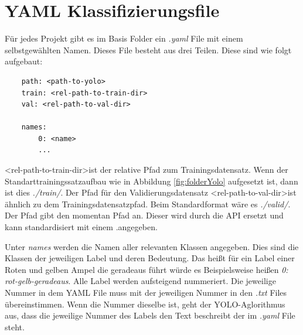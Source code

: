 \section{YAML Klassifizierungsfile}
\label{sec:yaml_class}

Für jedes Projekt gibt es im Basis Folder ein \textit{.yaml} File mit einem selbstgewählten Namen. Dieses File besteht aus drei Teilen. Diese sind wie folgt aufgebaut:
\begin{verbatim}
    path: <path-to-yolo>
    train: <rel-path-to-train-dir>
    val: <rel-path-to-val-dir>

    names:
        0: <name>
        ...
\end{verbatim}

\textless rel-path-to-train-dir\textgreater ist der relative Pfad zum Trainingsdatensatz. Wenn der Standarttrainingssatzaufbau wie in Abbildung \ref{fig:folderYolo} aufgesetzt ist, dann ist dies \textit{./train/}. Der Pfad für den Validierungsdatensatz \textless rel-path-to-val-dir\textgreater ist ähnlich zu dem Trainingsdatensatzpfad. Beim Standardformat wäre es \textit{./valid/}. Der Pfad gibt den momentan Pfad an. Dieser wird durch die API ersetzt und kann standardisiert mit einem  \glqq .\grqq angegeben.

Unter \textit{names} werden die Namen aller relevanten Klassen angegeben. Dies sind die Klassen der jeweiligen Label und deren Bedeutung. Das heißt für ein Label einer Roten und gelben Ampel die geradeaus führt würde es Beispielsweise heißen \textit{0: rot-gelb-geradeaus}. Alle Label werden aufsteigend nummeriert. Die jeweilige Nummer in dem YAML File muss mit der jeweiligen Nummer in den \textit{.txt} Files übereinstimmen. Wenn die Nummer dieselbe ist, geht der YOLO-Aglorithmus aus, dass die jeweilige Nummer des Labels den Text beschreibt der im \textit{.yaml} File steht.